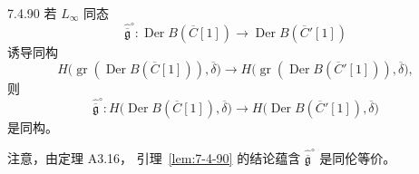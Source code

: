 
\begin{lemma}{7.4.90}\label{lem:7-4-90}
若 $L_\infty$ 同态
\[
\widehat{\overline{\mathfrak g}}^{\circ}:
\operatorname{Der}B(\overline C[1])
\longrightarrow
\operatorname{Der}B(\overline C'[1])
\]
诱导同构
\begin{equation}
H\bigl(
\operatorname{gr}(\operatorname{Der}B(\overline C[1])),
\overline\delta
\bigr)
\longrightarrow
H\bigl(
\operatorname{gr}(\operatorname{Der}B(\overline C'[1])),
\overline\delta
\bigr),
\tag{7.4.91}\label{eq:7-4-91}
\end{equation}
则
\begin{equation}
\widehat{\overline{\mathfrak g}}^{\circ}:
H\bigl(
\operatorname{Der}B(\overline C[1]),
\overline\delta
\bigr)
\longrightarrow
H\bigl(
\operatorname{Der}B(\overline C'[1]),
\overline\delta
\bigr)
\tag{7.4.92}\label{eq:7-4-92}
\end{equation}
是同构。
\end{lemma}

注意，由定理 A3.16，
引理~\ref{lem:7-4-90} 的结论蕴含
$\widehat{\overline{\mathfrak g}}^{\circ}$
是同伦等价。

